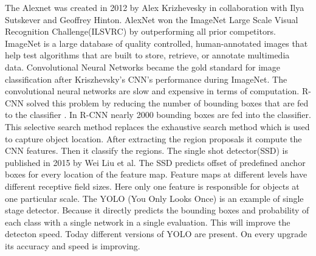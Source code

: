 \documentclass{svproc}
\begin{document}
The Alexnet was created in 2012 by Alex Krizhevesky in collaboration with Ilya Sutskever and Geoffrey Hinton. AlexNet won the ImageNet Large Scale Visual Recognition Challenge(ILSVRC) by outperforming all prior competitors. ImageNet \cite{imagenet} is a large database of quality controlled, human-annotated images that help test algorithms that are built to store, retrieve, or annotate multimedia data. Convolutional Neural Networks became the gold standard for image classification after Kriszhevsky's CNN's performance during ImageNet. The convolutional neural networks are slow and expensive in terms of computation. R-CNN solved this problem by reducing the number of bounding boxes that are fed to the classifier \cite{3}. In R-CNN nearly 2000 bounding boxes are fed into the classifier. This selective search method replaces the exhaustive search method which is used to capture object location. After extracting the region proposals \cite{9} it compute the CNN features. Then it classify the regions. The single shot detector(SSD) \cite{ssd} is published in 2015 by Wei Liu et al. The SSD predicts offset of predefined anchor boxes for every location of the feature map. Feature maps at different levels have different receptive field sizes. Here only one feature is responsible for objects at one particular scale. The YOLO (You Only Looks Once) \cite{yolo} is an example of single stage detector. Because it directly predicts the bounding boxes and probability of each class with a single network in a single evaluation. This will improve the detecton speed. Today different versions of YOLO are present. On every upgrade its accuracy and speed is improving.
\end{document}
